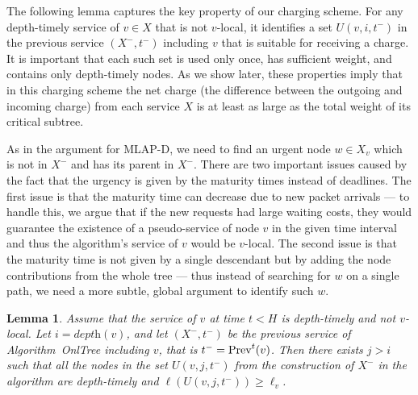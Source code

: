 \documentclass[a4paper]{article}
\newtheorem{lemma}[theorem]{Lemma}
\newcommand{\length}{\ell}
\newcommand{\depth}{\textit{depth}}
\newcommand{\OnAlgTreesGeneral}{{\sc OnlTree}}
\newcommand{\MLAPD}{\mbox{\rm\textsf{MLAP-D}}}
\newcommand{\prv}[2]{\mbox{\rm Prev}^#1(#2)}
\begin{document}
The following lemma captures the key property of our charging scheme.  For any
depth-timely service of $v\in X$ that is not $v$-local, it identifies
a set $U(v,i,t^-)$ in the previous service $(X^-,t^-)$ including $v$
that is suitable for receiving a charge. It is important that each such set is
used only once, has sufficient weight, and contains only depth-timely
nodes.  As we show later, these properties imply that in this charging scheme
the net charge (the difference between the outgoing and incoming charge)
from each service $X$ is at least as large as
the total weight of its critical subtree.

As in the argument for {\MLAPD}, we need to find an urgent node 
$w\in X_v$ which is not in $X^-$ and has its parent in $X^-$. There
are two important issues caused by the fact that the urgency is
given by the maturity times instead of deadlines. The first issue is
that the maturity time can decrease due to new packet arrivals --- to
handle this, we argue that if the new requests had large waiting
costs, they would guarantee the existence of a pseudo-service of node $v$ in the given
time interval and thus the algorithm's service of
$v$ would be $v$-local. The second issue is that the
maturity time is not given by a single descendant but by adding the node
contributions from the whole tree --- thus instead of searching for $w$ on
a single path, we need a more subtle, global argument to identify such $w$.


\begin{lemma}\label{l:charge}
Assume that the service of $v$ at time $t<H$ is depth-timely and
not $v$-local.  Let $i= \depth(v)$, and let $(X^-,t^-)$ be
the previous service of Algorithm~{\OnAlgTreesGeneral} including $v$, that is
$t^-=\prv{t}{v}$. Then there exists $j>i$ such that all the nodes in
the set $U(v,j,t^-)$ from the construction of $X^-$ in the
algorithm are depth-timely and $\length(U(v,j,t^-))\geq \length_v$.
\end{lemma}
\end{document}
